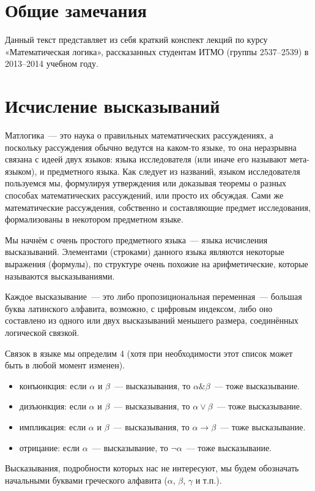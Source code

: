 \documentclass[a4paper,11pt]{article}
\theoremstyle{definition}
\newcommand{\amp}{\mathbin{\&}}
\begin{document}
\section{Общие замечания}
Данный текст представляет из себя краткий конспект лекций по курсу
«Математическая логика», рассказанных студентам ИТМО (группы 2537--2539) в
2013--2014 учебном году.

\section{Исчисление высказываний}
Матлогика~--- это наука о правильных математических рассуждениях, а поскольку
рассуждения обычно ведутся на каком-то языке, то она неразрывна связана с идеей
двух языков: языка исследователя (или иначе его называют мета-языком), и
предметного языка. Как следует из названий, языком исследователя пользуемся мы,
формулируя утверждения или доказывая теоремы о разных способах математических
рассуждений, или просто их обсуждая. Сами же математические рассуждения,
собственно и составляющие предмет исследования, формализованы в некотором
предметном языке.

Мы начнём с очень простого предметного языка~--- языка исчисления высказываний.
Элементами (строками) данного языка являются некоторые выражения (формулы), по
структуре очень похожие на арифметические, которые называются высказываниями.

Каждое высказывание~--- это либо пропозициональная переменная~--- большая буква
латинского алфавита, возможно, с цифровым индексом, либо оно составлено из
одного или двух высказываний меньшего размера, соединённых логической связкой.

Связок в языке мы определим 4 (хотя при необходимости этот список может быть в
любой момент изменен).
\begin{itemize}
\item конъюнкция: если $\alpha$ и $\beta$~--- высказывания, то $\alpha \amp \beta$~---
  тоже высказывание.
\item дизъюнкция: если $\alpha$ и $\beta$~--- высказывания, то $\alpha \vee \beta$~---
  тоже высказывание.
\item импликация: если $\alpha$ и $\beta$~--- высказывания, то $\alpha \to \beta$~---
  тоже высказывание.
\item отрицание: если $\alpha$~--- высказывание, то $\neg\alpha$~--- тоже
  высказывание.
\end{itemize}
Высказывания, подробности которых нас не интересуют, мы будем обозначать
начальными буквами греческого алфавита ($\alpha$, $\beta$, $\gamma$ и т.п.).
\end{document}
